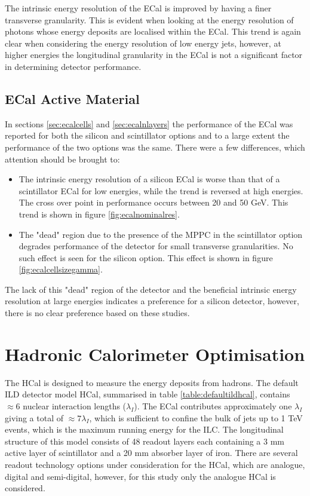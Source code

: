 The intrinsic energy resolution of the ECal is improved by having a finer transverse granularity.  This is evident when looking at the energy resolution of photons whose energy deposits are localised within the ECal.  This trend is again clear when considering the energy resolution of low energy jets, however, at higher energies the longitudinal granularity in the ECal is not a significant factor in determining detector performance.

\subsection{ECal Active Material}
In sections \ref{sec:ecalcells} and \ref{sec:ecalnlayers} the performance of the ECal was reported for both the silicon and scintillator options and to a large extent the performance of the two options was the same.  There were a few differences, which attention should be brought to:

\begin{itemize}
\item The intrinsic energy resolution of a silicon ECal is worse than that of a scintillator ECal for low energies, while the trend is reversed at high energies.  The cross over point in performance occurs between 20 and 50 GeV.  This trend is shown in figure \ref{fig:ecalnominalres}.    
\item The "dead" region due to the presence of the MPPC in the scintillator option degrades performance of the detector for small transverse granularities.  No such effect is seen for the silicon option.  This effect is shown in figure \ref{fig:ecalcellsizegamma}.
\end{itemize}

The lack of this "dead" region of the detector and the beneficial intrinsic energy resolution at large energies indicates a preference for a silicon detector, however, there is no clear preference based on these studies.  

\section{Hadronic Calorimeter Optimisation}
The HCal is designed to measure the energy deposits from hadrons.  The default ILD detector model HCal, summarised in table \ref{table:defaultildhcal}, contains $\approx 6$ nuclear interaction lengths ($\lambda_{I}$).  The ECal contributes approximately one $\lambda_{I}$ giving a total of $\approx 7 \lambda_{I}$, which is sufficient to confine the bulk of jets up to 1 TeV events, which is the maximum running energy for the ILC.  The longitudinal structure of this model consists of 48 readout layers each containing a 3 mm active layer of scintillator and a 20 mm absorber layer of iron.  There are several readout technology options under consideration for the HCal, which are analogue, digital and semi-digital, however, for this study only the analogue HCal is considered.  

